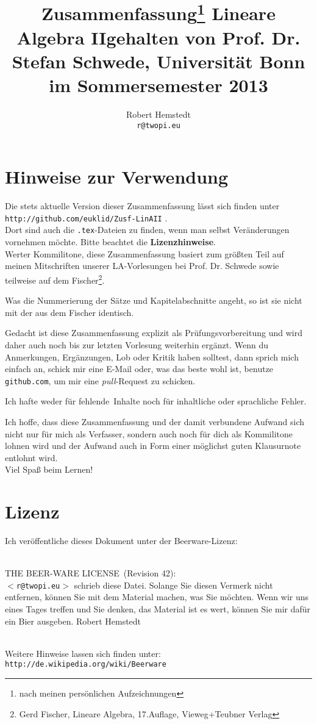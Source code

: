 \documentclass[12pt,a4paper]{article}
\author{Robert Hemstedt \\ \texttt{r@twopi.eu}}
\title{Zusammenfassung\footnote{nach meinen pers\"onlichen Aufzeichnungen} Lineare Algebra II\newline \newline \large{gehalten von Prof. Dr. Stefan Schwede, Universität Bonn} \\im Sommersemester 2013}
\theoremstyle{plain}
\numberwithin{equation}{section}
\newenvironment{fmpage}[1]
{\begin{lrbox}{\fmbox}\begin{minipage}{#1}}
{\end{minipage}\end{lrbox}\fbox{\usebox{\fmbox}}}
\begin{document}
\maketitle
\section*{Hinweise zur Verwendung}
Die stets aktuelle Version dieser Zusammenfassung lässt sich finden unter\\
\texttt{http://github.com/euklid/Zusf-LinAII} .\\
Dort sind auch die \texttt{.tex}-Dateien zu finden, wenn man selbst Veränderungen vornehmen möchte. Bitte beachtet die \textbf{Lizenzhinweise}.\\

Werter Kommilitone, diese Zusammenfassung basiert zum größten Teil auf meinen Mitschriften unserer LA-Vorlesungen bei Prof. Dr. Schwede sowie teilweise auf dem Fischer\footnote{Gerd Fischer, Lineare Algebra, 17.Auflage, Vieweg+Teubner Verlag}. 

Was die Nummerierung der Sätze und Kapitelabschnitte angeht, so ist sie nicht mit der aus dem Fischer identisch.

Gedacht ist diese Zusammenfassung explizit als Prüfungsvorbereitung und wird daher auch noch bis zur letzten Vorlesung weiterhin ergänzt. Wenn du Anmerkungen, Ergänzungen, Lob oder Kritik haben solltest, dann sprich mich einfach an, schick mir eine E-Mail oder, was das beste wohl ist, benutze \texttt{github.com}, um mir eine \textit{pull}-Request zu schicken.

Ich hafte weder für \glqq fehlende\grqq\ Inhalte noch für inhaltliche oder sprachliche Fehler.

Ich hoffe, dass diese Zusammenfassung und der damit verbundene Aufwand sich nicht nur für mich als Verfasser, sondern auch noch für dich als Kommilitone lohnen wird und der Aufwand auch in Form einer möglichst guten Klausurnote entlohnt wird. \\
Viel Spaß beim Lernen!
\section*{Lizenz}
Ich veröffentliche dieses Dokument unter der Beerware-Lizenz:\\ \\
\hspace{-3.5cm}
\begin{fmpage}{\textwidth}
\glqq THE BEER-WARE LICENSE\grqq\ (Revision 42):\\
\texttt{$<$r@twopi.eu$>$} schrieb diese Datei. Solange Sie diesen Vermerk nicht entfernen, können Sie mit dem Material machen, was Sie möchten. Wenn wir uns eines Tages treffen und Sie denken, das Material ist es wert, können Sie mir dafür ein Bier ausgeben. Robert Hemstedt
\end{fmpage}
\hspace{3.5cm} \\
Weitere Hinweise lassen sich finden unter: \texttt{http://de.wikipedia.org/wiki/Beerware}
\end{document}
